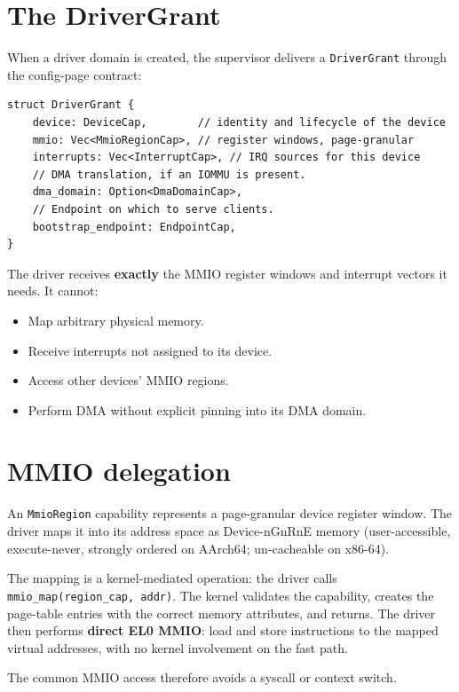 \section{The DriverGrant}

When a driver domain is created, the supervisor delivers a \texttt{DriverGrant}
through the config-page contract:

\begin{lstlisting}[style=rustCode]
struct DriverGrant {
    device: DeviceCap,        // identity and lifecycle of the device
    mmio: Vec<MmioRegionCap>, // register windows, page-granular
    interrupts: Vec<InterruptCap>, // IRQ sources for this device
    // DMA translation, if an IOMMU is present.
    dma_domain: Option<DmaDomainCap>,
    // Endpoint on which to serve clients.
    bootstrap_endpoint: EndpointCap,
}
\end{lstlisting}

The driver receives \textbf{exactly} the MMIO register windows and interrupt
vectors it needs. It cannot:
\begin{itemize}
    \item Map arbitrary physical memory.
    \item Receive interrupts not assigned to its device.
    \item Access other devices' MMIO regions.
    \item Perform DMA without explicit pinning into its DMA domain.
\end{itemize}

\section{MMIO delegation}

An \texttt{MmioRegion} capability represents a page-granular device register
window. The driver maps it into its address space as Device-nGnRnE memory
(user-accessible, execute-never, strongly ordered on AArch64; un-cacheable on
x86-64).

The mapping is a kernel-mediated operation: the driver calls
\texttt{mmio\_map(region\_cap, addr)}. The kernel validates the
capability, creates the page-table entries with the correct memory attributes,
and returns. The driver then performs \textbf{direct EL0 MMIO}: load and store
instructions to the mapped virtual addresses, with no kernel involvement on the
fast path.

The common MMIO access therefore avoids a syscall or context switch.


